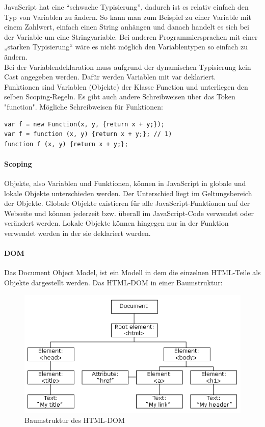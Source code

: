 JavaScript hat eine \enquote{schwache Typisierung}, dadurch ist es relativ einfach den Typ von Variablen zu ändern. So kann man zum Beispiel zu einer Variable mit einem  Zahlwert, einfach einen String anhängen und danach handelt es sich bei der Variable um eine Stringvariable. Bei anderen Programmiersprachen mit einer „starken Typisierung“ wäre es nicht möglich den Variablentypen so einfach zu ändern.\\
 Bei der Variablendeklaration muss aufgrund der dynamischen Typisierung kein Cast angegeben werden. Dafür werden Variablen mit var deklariert.\\
Funktionen sind Variablen (Objekte) der Klasse Function und unterliegen den selben Scoping-Regeln. Es gibt auch andere Schreibweisen über das Token "function". Mögliche Schreibweisen für Funktionen:\\
\begin{lstlisting}[language=html]
var f = new Function(x, y, {return x + y;});
var f = function (x, y) {return x + y;}; // 1)
function f (x, y) {return x + y;};
\end{lstlisting}

\paragraph{Scoping}
Objekte, also Variablen und Funktionen, können in JavaScript in globale und lokale Objekte unterschieden werden. Der Unterschied liegt im Geltungsbereich der Objekte. Globale Objekte existieren für alle JavaScript-Funktionen auf der Webseite und können jederzeit bzw. überall im JavaScript-Code verwendet oder verändert werden. Lokale Objekte können hingegen nur in der Funktion verwendet werden in der sie deklariert wurden.\\
\paragraph{DOM}
Das Document Object Model, ist ein Modell in dem die einzelnen HTML-Teile als Objekte dargestellt werden.
Das HTML-DOM in einer Baumstruktur:\\

\begin{figure}[H]
\includegraphics[keepaspectratio=true, width=14cm]{images/javascript/html_dom.png}
\caption{Baumstruktur des HTML-DOM}
\end{figure}

